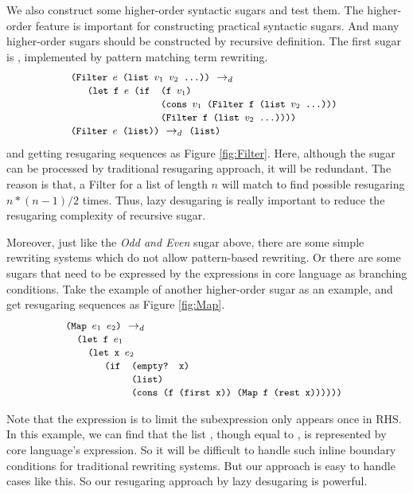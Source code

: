 We also construct some higher-order syntactic sugars and test them. The higher-order feature is important for constructing practical syntactic sugars. And many higher-order sugars should be constructed by recursive definition. The first sugar is , implemented by pattern matching term rewriting.
\[\begin{array}{l}
\texttt{\small(Filter $e$ (list $v_1$ $v_2$ ...))} ~\rightarrow_d~\\
\quad
\begin{array}{ll}
\texttt{\small (let f $e$ (if}&\texttt{\small(f $v_1$)}\\
&\texttt{\small (cons $v_1$ (Filter f (list $v_2$ ...)))}\\
&\texttt{\small (Filter f (list $v_2$ ...))))}
\end{array}
\\
\texttt{\small(Filter $e$ (list))} ~\rightarrow_d~ \texttt{\small(list)}
\end{array}\]
and getting resugaring sequences as Figure \ref{fig:Filter}.
Here, although the sugar can be processed by traditional resugaring approach, it will be redundant. The reason is that, a Filter for a list of length $n$ will match to find possible resugaring $n*(n-1)/2$ times. Thus, lazy desugaring is really important to reduce the resugaring complexity of recursive sugar.

Moreover, just like the \emph{Odd \emph{and} Even} sugar above, there are some simple rewriting systems which do not allow pattern-based rewriting. Or there are some sugars that need to be expressed by the expressions in core language as branching conditions. Take the example of another higher-order sugar  as an example, and get resugaring sequences as Figure \ref{fig:Map}.
\[
\begin{array}{l}
\texttt{\small(Map $e_1$ $e_2$)} ~\rightarrow_d~\\
\quad\texttt{\small (let f $e_1$}\\
\qquad\texttt{\small(let x $e_2$}\\
\qquad\quad
\begin{array}{ll}
\texttt{\small(if}&\texttt{\small(empty? x)}\\
&\texttt{\small(list)}\\
&\texttt{\small(cons (f (first x)) (Map f (rest x))))))}
\end{array}

\end{array}
\]



Note that the  expression is to limit the subexpression only appears once in RHS. In this example, we can find that the list , though equal to , is represented by core language's expression. So it will be difficult to handle such inline boundary conditions for traditional rewriting systems. But our approach is easy to handle cases like this. So our resugaring approach by lazy desugaring is powerful. 

